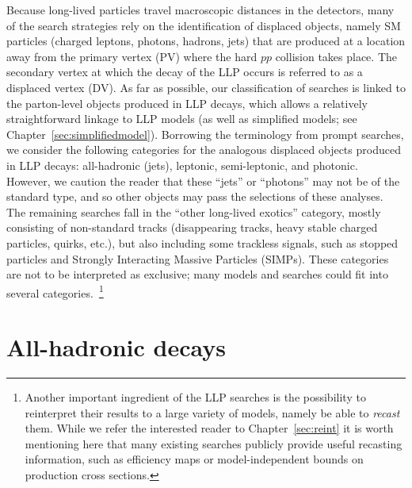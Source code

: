 Because long-lived particles travel macroscopic distances in the detectors, many of the search strategies rely on the identification of displaced objects, namely SM particles (charged leptons, photons, hadrons, jets) that are produced at a location away from the primary vertex (PV) where the hard $pp$ collision takes place. The secondary vertex at which the decay of the LLP occurs is referred to as a displaced vertex (DV). As far as possible, our classification of searches is linked to the parton-level objects produced in LLP decays, which allows a relatively straightforward linkage to LLP models (as well as simplified models; see Chapter~\ref{sec:simplifiedmodel}). Borrowing the terminology from prompt searches, we  consider the following categories for the analogous displaced objects produced in LLP decays: all-hadronic (jets), leptonic, semi-leptonic, and photonic. However, we caution the reader that these ``jets'' or ``photons'' may not be of the standard type, and so other objects may pass the selections of these analyses. The remaining searches  fall in the ``other long-lived exotics'' category, mostly consisting of non-standard tracks (disappearing tracks,  heavy stable charged particles, quirks, etc.), but also including some trackless signals, such as stopped particles and Strongly Interacting Massive Particles (SIMPs). These categories are not to be interpreted as exclusive; many models and searches could fit into several categories.~\footnote{Another important ingredient of the LLP searches is the possibility to reinterpret their results to a large variety of models, namely be able to \emph{recast} them. While we refer the interested reader to Chapter~\ref{sec:reint} it is worth mentioning here that many existing searches publicly provide useful recasting information, such as efficiency maps or model-independent bounds on production cross sections.}

\section{All-hadronic decays}
\label{subsec:djets}

